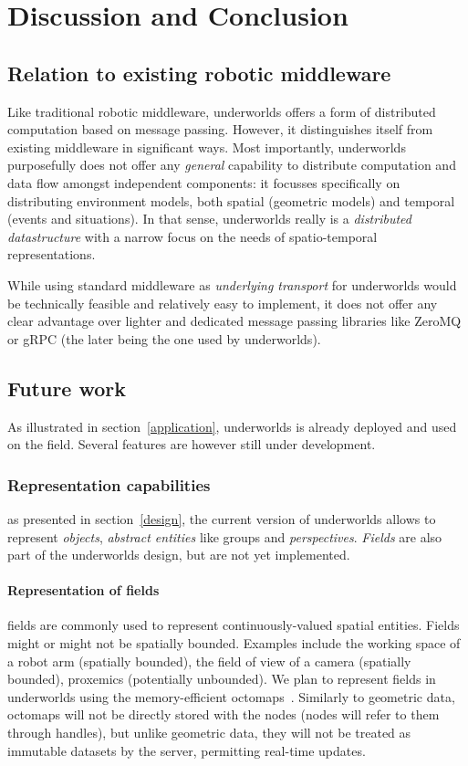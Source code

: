 \documentclass[conference]{IEEEtran}
\newcommand{\uwds}{{\sc underworlds}\xspace}
\begin{document}
\section{Discussion and Conclusion}

\subsection{Relation to existing robotic middleware}

Like traditional robotic middleware, \uwds offers a form of distributed
computation based on message passing. However, it distinguishes itself from
existing middleware in significant ways. Most importantly, \uwds purposefully
does not offer any \emph{general} capability to distribute computation and data
flow amongst independent components: it focusses specifically on distributing
environment models, both spatial (geometric models) and temporal (events and
situations). In that sense, \uwds really is a \emph{distributed datastructure}
with a narrow focus on the needs of spatio-temporal representations.

While using standard middleware as \emph{underlying transport} for \uwds would be
technically feasible and relatively easy to implement, it does not offer any
clear advantage over lighter and dedicated message passing libraries like ZeroMQ
or gRPC (the later being the one used by \uwds).

\subsection{Future work}
\label{futurework}

As illustrated in section~\ref{application}, \uwds is already deployed and used
on the field. Several features are however still under development.

\subsubsection{Representation capabilities} as presented in
section~\ref{design}, the current version of \uwds allows to represent
\emph{objects}, \emph{abstract entities} like groups and \emph{perspectives}.
\emph{Fields} are also part of the \uwds design, but are not yet implemented.

\paragraph*{Representation of fields} fields are commonly used to represent
continuously-valued spatial entities. Fields might or might not be spatially
bounded. Examples include the working space of a robot arm (spatially bounded),
the field of view of a camera (spatially bounded), proxemics (potentially
unbounded). We plan to represent fields in \uwds using the memory-efficient
octomaps~\cite{hornung2013octomap}. Similarly to geometric data, octomaps
will not be directly stored with the nodes (nodes will refer to them through 
handles), but unlike geometric data, they will not be treated as immutable
datasets by the server, permitting real-time updates.
\end{document}
